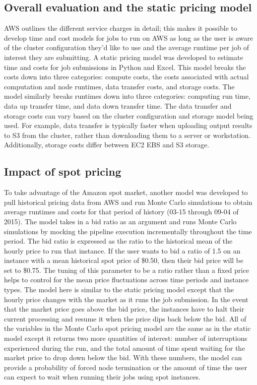 \documentclass{frontiersSCNS} %
\begin{document}
\subsection{Overall evaluation and the static pricing model}

AWS outlines the different service charges in detail; this makes it possible to develop time and cost models for jobs to run on AWS as long as the user is aware of the cluster configuration they’d like to use and the average runtime per job of interest they are submitting. A static pricing model was developed to estimate time and costs for job submissions in Python and Excel. This model breaks the costs down into three categories: compute costs, the costs associated with actual computation and node runtimes, data transfer costs, and storage costs. The model similarly breaks runtimes down into three categories: computing run time, data up transfer time, and data down transfer time. The data transfer and storage costs can vary based on the cluster configuration and storage model being used. For example, data transfer is typically faster when uploading output results to S3 from the cluster, rather than downloading them to a server or workstation. Additionally, storage costs differ between EC2 EBS and S3 storage.

\subsection{Impact of spot pricing}
To take advantage of the Amazon spot market, another model was developed to pull historical pricing data from AWS and run Monte Carlo simulations to obtain average runtimes and costs for that period of history (03-15 through 09-04 of 2015). The model takes in a bid ratio as an argument and runs Monte Carlo simulations by mocking the pipeline execution incrementally throughout the time period. The bid ratio is expressed as the ratio to the historical mean of the hourly price to run that instance. If the user wants to bid a ratio of 1.5 on an instance with a mean historical spot price of \$0.50, then their bid price will be set to \$0.75. The tuning of this parameter to be a ratio rather than a fixed price helps to control for the mean price fluctuations across time periods and instance types. The model here is similar to the static pricing model except that the hourly price changes with the market as it runs the job submission. In the event that the market price goes above the bid price, the instances have to halt their current processing and resume it when the price dips back below the bid. All of the variables in the Monte Carlo spot pricing model are the same as in the static model except it returns two more quantities of interest: number of interruptions experienced during the run, and the total amount of time spent waiting for the market price to drop down below the bid. With these numbers, the model can provide a probability of forced node termination or the amount of time the user can expect to wait when running their jobs using spot instances.
\end{document}

